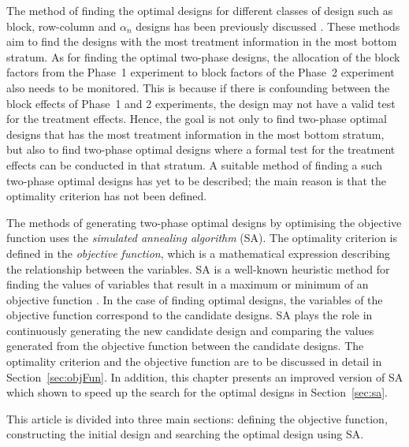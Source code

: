 \documentclass[article]{jss}
\begin{document}
The method of finding the optimal designs for different classes of design such as block, row-column and $\alpha_n$ designs has been previously discussed \citep{whitaker1990, Williams1996, John2002}. These methods aim to find the designs with the most treatment information in the most bottom stratum. As for finding the optimal two-phase designs, the allocation of the block factors from the Phase~1 experiment to block factors of the Phase~2 experiment also needs to be monitored. This is because if there is confounding between the block effects of Phase~1 and 2 experiments, the design may not have a valid test for the treatment effects. Hence, the goal is not only to find two-phase optimal designs that has the most treatment information in the most bottom stratum, but also to find two-phase optimal designs where a formal test for the treatment effects can be conducted in that stratum. A suitable method of finding a such two-phase optimal designs has yet to be described; the main reason is that the optimality criterion has not been defined.

The methods of generating two-phase optimal designs by optimising the objective function uses the \emph{simulated annealing algorithm} (SA). The optimality criterion is defined in the \emph{objective function}, which is a mathematical expression describing the relationship between the variables. SA is a well-known heuristic method for finding the values of variables that result in a maximum or minimum of an objective function \citep{Kirkpatrick1983}. In the case of finding optimal designs, the variables of the objective function correspond to the candidate designs. SA plays the role in continuously generating the new candidate design and comparing the values generated from the objective function between the candidate designs. The optimality criterion and the objective function are to be discussed in detail in Section~\ref{sec:objFun}. In addition, this chapter presents an improved version of SA which shown to speed up the search for the optimal designs in Section~\ref{sec:sa}. 


This article is divided into three main sections: defining the objective function, constructing the initial design and searching the optimal design using SA. 

\end{document}

